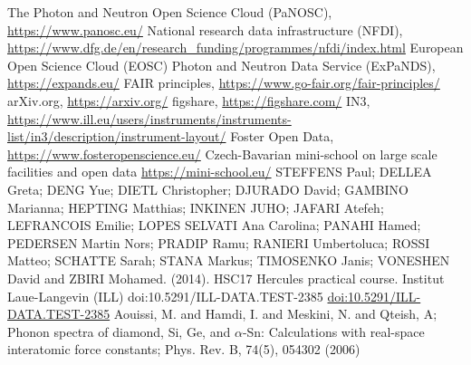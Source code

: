 \documentclass[aps,prx,reprint,amsmath,amssymb,superscriptaddress,showpacs]{revtex4-1}
\begin{document}
\begin{thebibliography}{9}

 The Photon and Neutron Open Science Cloud (PaNOSC), \url{https://www.panosc.eu/}
 National research data infrastructure (NFDI), \url{https://www.dfg.de/en/research_funding/programmes/nfdi/index.html}
 European Open Science Cloud (EOSC) Photon and Neutron Data Service (ExPaNDS), \url{https://expands.eu/}
 FAIR principles, \url{https://www.go-fair.org/fair-principles/}
 arXiv.org, \url{https://arxiv.org/}
 figshare, \url{https://figshare.com/}
 IN3, \url{https://www.ill.eu/users/instruments/instruments-list/in3/description/instrument-layout/}
 Foster Open Data, \url{https://www.fosteropenscience.eu/}
 Czech-Bavarian mini-school on large scale facilities and open data \url{https://mini-school.eu/}
STEFFENS Paul; DELLEA Greta; DENG Yue; DIETL Christopher; DJURADO David; GAMBINO Marianna; HEPTING Matthias; INKINEN JUHO; JAFARI Atefeh; LEFRANCOIS Emilie; LOPES SELVATI Ana Carolina; PANAHI Hamed; PEDERSEN Martin Nors; PRADIP Ramu; RANIERI Umbertoluca; ROSSI Matteo; SCHATTE Sarah; STANA Markus; TIMOSENKO Janis; VONESHEN David and ZBIRI Mohamed. (2014). HSC17 Hercules practical course. Institut Laue-Langevin (ILL) doi:10.5291/ILL-DATA.TEST-2385 \url{doi:10.5291/ILL-DATA.TEST-2385}
 Aouissi, M. and Hamdi, I. and Meskini, N. and Qteish, A; Phonon spectra of diamond, Si, Ge, and $\alpha$-Sn: Calculations with real-space interatomic force constants; Phys. Rev. B, 74(5), 054302 (2006)

\end{thebibliography}
\end{document}
